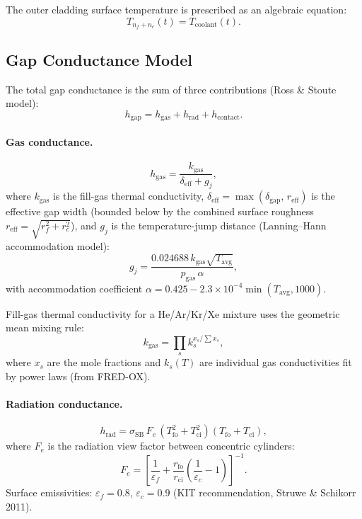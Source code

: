 \documentclass[11pt,a4paper]{article}
\begin{document}
The outer cladding surface temperature is prescribed as an algebraic
equation:
\begin{equation}
  T_{n_f + n_c}(t) = T_{\mathrm{coolant}}(t).
\end{equation}

\subsection{Gap Conductance Model}

The total gap conductance is the sum of three contributions (Ross \& Stoute
model):
\begin{equation}
  h_{\mathrm{gap}} = h_{\mathrm{gas}} + h_{\mathrm{rad}} + h_{\mathrm{contact}}.
  \label{eq:htot}
\end{equation}

\paragraph{Gas conductance.}
\begin{equation}
  h_{\mathrm{gas}} = \frac{k_{\mathrm{gas}}}{\delta_{\mathrm{eff}} + g_j},
  \label{eq:hgas}
\end{equation}
where $k_{\mathrm{gas}}$ is the fill-gas thermal conductivity,
$\delta_{\mathrm{eff}} = \max(\delta_{\mathrm{gap}},\,r_{\mathrm{eff}})$
is the effective gap width (bounded below by the combined surface roughness
$r_{\mathrm{eff}}=\sqrt{r_f^2 + r_c^2}$), and $g_j$ is the temperature-jump
distance (Lanning–Hann accommodation model):
\begin{equation}
  g_j = \frac{0.024688 \, k_{\mathrm{gas}} \sqrt{T_{\mathrm{avg}}}}{p_{\mathrm{gas}} \, \alpha},
\end{equation}
with accommodation coefficient $\alpha = 0.425 - 2.3\times10^{-4} \min(T_{\mathrm{avg}}, 1000)$.

Fill-gas thermal conductivity for a He/Ar/Kr/Xe mixture uses the geometric
mean mixing rule:
\begin{equation}
  k_{\mathrm{gas}} = \prod_{s} k_s^{x_s/\sum x_s},
\end{equation}
where $x_s$ are the mole fractions and $k_s(T)$ are individual gas conductivities
fit by power laws (from FRED-OX).

\paragraph{Radiation conductance.}
\begin{equation}
  h_{\mathrm{rad}} = \sigma_{\mathrm{SB}} \, F_e
    \,(T_{\mathrm{fo}}^2 + T_{\mathrm{ci}}^2)(T_{\mathrm{fo}} + T_{\mathrm{ci}}),
\end{equation}
where $F_e$ is the radiation view factor between concentric cylinders:
\begin{equation}
  F_e = \left[\frac{1}{\varepsilon_f} + \frac{r_{\mathrm{fo}}}{r_{\mathrm{ci}}}
        \left(\frac{1}{\varepsilon_c} - 1\right)\right]^{-1}.
\end{equation}
Surface emissivities: $\varepsilon_f = 0.8$, $\varepsilon_c = 0.9$
(KIT recommendation, Struwe \& Schikorr 2011).
\end{document}

